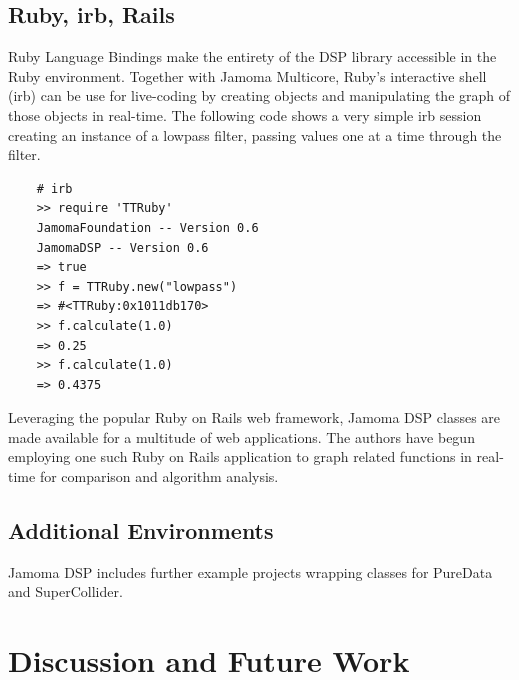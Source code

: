 \documentclass[twoside,10pt]{article}
\begin{document}
\subsection{Ruby, irb, Rails}
Ruby Language Bindings make the entirety of the DSP library accessible in the Ruby environment.  Together with Jamoma Multicore, Ruby's interactive shell (irb) can be use for live-coding by creating objects and manipulating the graph of those objects in real-time.  The following code shows a very simple irb session creating an instance of a lowpass filter, passing values one at a time through the filter.

\begin{lstlisting}
    # irb
    >> require 'TTRuby'
    JamomaFoundation -- Version 0.6
    JamomaDSP -- Version 0.6
    => true
    >> f = TTRuby.new("lowpass")
    => #<TTRuby:0x1011db170>
    >> f.calculate(1.0)
    => 0.25
    >> f.calculate(1.0)
    => 0.4375
\end{lstlisting}

\noindent Leveraging the popular Ruby on Rails web framework, Jamoma DSP classes are made available for a multitude of web applications.  The authors have begun employing one such Ruby on Rails application to graph related functions in real-time for comparison and algorithm analysis.


\subsection{Additional Environments}

Jamoma DSP includes further example projects wrapping classes for PureData and SuperCollider.




\section{Discussion and Future Work} %

\end{document}
